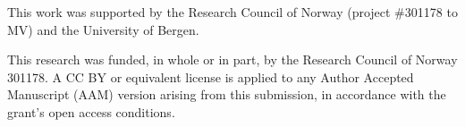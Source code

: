 \documentclass[]{article}
\begin{document}
This work was supported by the Research Council of Norway (project \#301178 to MV) and the University of Bergen.

This research was funded, in whole or in part, by the Research Council of Norway 301178. A CC BY or equivalent license is applied to any Author Accepted Manuscript (AAM) version arising from this submission, in accordance with the grant’s open access conditions.





\end{document}
